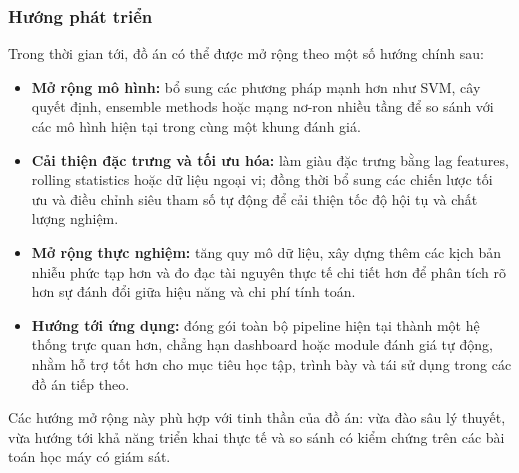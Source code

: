 \subsubsection{Hướng phát triển}

Trong thời gian tới, đồ án có thể được mở rộng theo một số hướng chính sau:
\begin{itemize}[labelsep=10pt, leftmargin=1.8cm]
    \item \textbf{Mở rộng mô hình:} bổ sung các phương pháp mạnh hơn như SVM, cây quyết định, ensemble methods hoặc mạng nơ-ron nhiều tầng để so sánh với các mô hình hiện tại trong cùng một khung đánh giá.

    \item \textbf{Cải thiện đặc trưng và tối ưu hóa:} làm giàu đặc trưng bằng lag features, rolling statistics hoặc dữ liệu ngoại vi; đồng thời bổ sung các chiến lược tối ưu và điều chỉnh siêu tham số tự động để cải thiện tốc độ hội tụ và chất lượng nghiệm.

    \item \textbf{Mở rộng thực nghiệm:} tăng quy mô dữ liệu, xây dựng thêm các kịch bản nhiễu phức tạp hơn và đo đạc tài nguyên thực tế chi tiết hơn để phân tích rõ hơn sự đánh đổi giữa hiệu năng và chi phí tính toán.

    \item \textbf{Hướng tới ứng dụng:} đóng gói toàn bộ pipeline hiện tại thành một hệ thống trực quan hơn, chẳng hạn dashboard hoặc module đánh giá tự động, nhằm hỗ trợ tốt hơn cho mục tiêu học tập, trình bày và tái sử dụng trong các đồ án tiếp theo.
\end{itemize}

Các hướng mở rộng này phù hợp với tinh thần của đồ án: vừa đào sâu lý thuyết, vừa hướng tới khả năng triển khai thực tế và so sánh có kiểm chứng trên các bài toán học máy có giám sát.

\clearpage